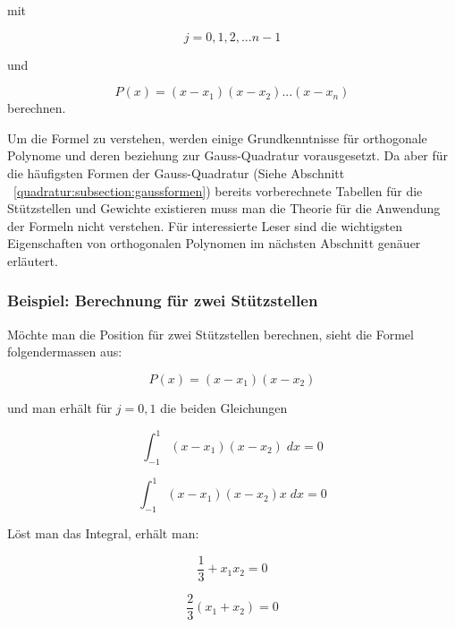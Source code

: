 \noindent
mit

\begin{equation*}
    j = 0, 1, 2, ... n - 1
\end{equation*}

\noindent
und 

\begin{equation}
    P(x) = (x - x_{1})(x - x_{2}) ... (x - x_{n})
\end{equation}
\noindent
berechnen.
\newline

\noindent
Um die Formel zu verstehen, werden einige Grundkenntnisse für 
orthogonale Polynome und deren beziehung zur Gauss-Quadratur vorausgesetzt.
Da aber für die häufigsten Formen der Gauss-Quadratur 
(Siehe Abschnitt ~\ref{quadratur:subsection:gaussformen}) bereits vorberechnete
Tabellen für die Stützstellen und Gewichte existieren muss man die Theorie
für die Anwendung der Formeln nicht verstehen. Für interessierte Leser sind 
die wichtigsten Eigenschaften von orthogonalen Polynomen im nächsten 
Abschnitt genäuer erläutert.

\newpage

\subsubsection{Beispiel: Berechnung für zwei Stützstellen}
Möchte man die Position für zwei Stützstellen berechnen, sieht die Formel folgendermassen aus:

\begin{equation}
    P(x) = (x - x_{1})(x - x_{2})
\end{equation}

\noindent
und man erhält für $j = 0,1$ die beiden Gleichungen

\begin{equation*}
    \int_{-1}^{1}(x - x_{1})(x - x_{2}) \; dx = 0
\end{equation*}

\begin{equation*}
    \int_{-1}^{1}(x - x_{1})(x - x_{2})x \; dx = 0
\end{equation*}

\noindent
Löst man das Integral, erhält man:

\begin{equation*}
    \frac{1}{3} + x_{1}x_{2} = 0
\end{equation*}

\begin{equation}
    \frac{2}{3}(x_{1}+x_{2}) = 0
\end{equation}

